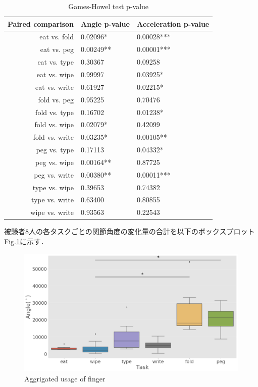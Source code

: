 \begin{table}[H]
  \caption{Games-Howel test p-value}
  \label{table:games}
  \centering
  \begin{tabular}{rll}
    \hline 
Paired comparison &  Angle p-value  & Acceleration p-value\\
    \hline \hline
eat vs. fold     & 0.02096*&0.00028***\\
eat vs. peg      & 0.00249**&0.00001***\\
eat vs. type     & 0.30367&0.09258\\
eat vs. wipe     & 0.99997&0.03925*\\
eat vs. write    & 0.61927&0.02215*\\
fold vs. peg     & 0.95225&0.70476\\
fold vs. type    & 0.16702&0.01238*\\
fold vs. wipe    & 0.02079*&0.42099\\
fold vs. write   & 0.03235*&0.00105**\\
peg vs. type     & 0.17113&0.04332*\\
peg vs. wipe     & 0.00164**&0.87725\\
peg vs. write    & 0.00380**&0.00011***\\
type vs. wipe    & 0.39653&0.74382\\
type vs. write   & 0.63400&0.80855\\
wipe vs. write   & 0.93563&0.22543\\
    \hline
  \end{tabular}
\end{table}


被験者8人の各タスクごとの関節角度の変化量の合計を以下のボックスプロットFig.\ref{fig:angle_usage}に示す．


\begin{figure}[H]
  \centering
  \includegraphics[width=0.8\linewidth]{fig/boxplot_angle}
  \caption{Aggrigated usage of finger }
  \label{fig:angle_usage}
\end{figure}



